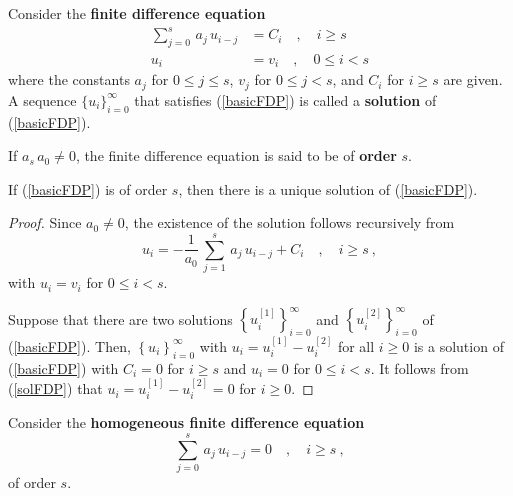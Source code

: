 \begin{defn}
Consider the
{\bfseries finite difference equation}
\begin{equation}  \label{basicFDP}
\begin{split}
\sum_{j=0}^s\,a_j\,u_{i-j} &= C_i \quad, \quad i \geq s \\
u_i &= v_i \quad, \quad 0 \leq i < s
\end{split}
\end{equation}
where the constants $a_j$ for $0\leq j \leq s$, $v_j$ for
$0 \leq j < s$, and $C_i$ for $i\geq s$ are given.
A sequence $\{ u_i \}_{i=0}^\infty$ that satisfies (\ref{basicFDP})
is called a
{\bfseries solution} of
(\ref{basicFDP}).

If $a_s\,a_0 \neq 0$, the finite difference equation is said to be of
{\bfseries order} $s$.
\end{defn}

\begin{theorem}
If (\ref{basicFDP}) is of order $s$, then there is a unique solution
of (\ref{basicFDP}).
\end{theorem}

\begin{proof}
Since $a_0 \neq 0$, the existence of the solution follows recursively from
\begin{equation} \label{solFDP}
u_i = -\frac{1}{a_0} \, \sum_{j=1}^s\,a_j\,u_{i-j} 
+ C_i \quad, \quad i \geq s \ ,
\end{equation}
with $u_i = v_i$ for $0 \leq i < s$.

Suppose that there are two solutions
$\displaystyle \left\{ u_i^{[1]} \right\}_{i=0}^\infty$ and
$\displaystyle \left\{u_i^{[2]} \right\}_{i=0}^\infty$ of
(\ref{basicFDP}).  Then,
$\displaystyle \left\{ u_i \right\}_{i=0}^\infty$ with
$u_i = u_i^{[1]} - u_i^{[2]}$ for all $i\geq 0$ is a solution of
(\ref{basicFDP}) with $C_i = 0$ for $i\geq s$ and $u_i = 0$ for
$0 \leq i < s$.  It follows from (\ref{solFDP}) that
$u_i = u_i^{[1]} - u_i^{[2]} = 0$ for $i\geq 0$.
\end{proof}

Consider the {\bfseries homogeneous finite difference
equation}
\begin{equation} \label{homFDP}
\sum_{j=0}^s\,a_j\,u_{i-j} = 0 \quad, \quad i \geq s \ ,
\end{equation}
of order $s$.


